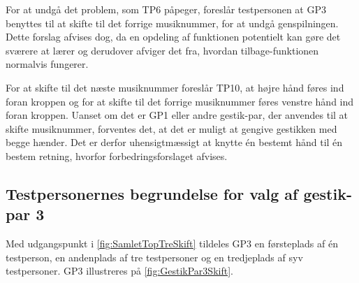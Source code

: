 For at undgå det problem, som TP6 påpeger, foreslår testpersonen at GP3 benyttes til at skifte til det forrige musiknummer, for at undgå genspilningen. Dette forslag afvises dog, da en opdeling af funktionen potentielt kan gøre det sværere at lærer og derudover afviger det fra, hvordan tilbage-funktionen normalvis fungerer. 

For at skifte til det næste musiknummer foreslår TP10, at højre hånd føres ind foran kroppen og for at skifte til det forrige musiknummer føres venstre hånd ind foran kroppen. Uanset om det er GP1 eller andre gestik-par, der anvendes til at skifte musiknummer, forventes det, at det er muligt at gengive gestikken med begge hænder. Det er derfor uhensigtmæssigt at knytte én bestemt hånd til én bestem retning, hvorfor forbedringsforslaget afvises.     
%
\subsection{Testpersonernes begrundelse for valg af gestik-par 3}
\label{TestresultaterValgAfGestikkerBegrundelseGP3Skift}
% 
Med udgangspunkt i \autoref{fig:SamletTopTreSkift} tildeles GP3 en førsteplads af én testperson, en andenplads af tre testpersoner og en tredjeplads af syv testpersoner. GP3 illustreres på \autoref{fig:GestikPar3Skift}. 

